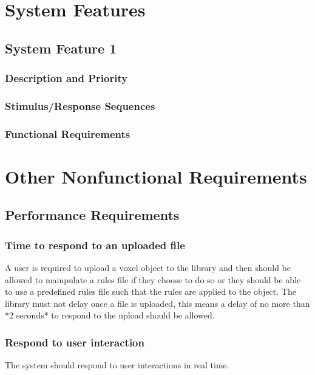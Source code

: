 \documentclass[english]{article}
\begin{document}
	\pagebreak
	
	\section{System Features}
	
		\subsection{System Feature 1}
		
			 \subsubsection{Description and Priority}
			 
			 \subsubsection{Stimulus/Response Sequences}
			 
			 \subsubsection{Functional Requirements}
			 
	\pagebreak
	
	\section{Other Nonfunctional Requirements}
	
		\subsection{Performance Requirements}
		\subsubsection {Time to respond to an uploaded file}
		A user is required to upload a voxel object to the library and then should be allowed to mainpulate a rules file if they choose to do so or they should be able to use a predefined rules file such that the rules are applied to the object. The library must not delay once a file is uploaded, this means a delay of no 
		more than *2 seconds* to respond to the upload should be allowed.
		
		\subsubsection{Respond to user interaction}
		The system should respond to user interactions in real time.
		
\end{document}
